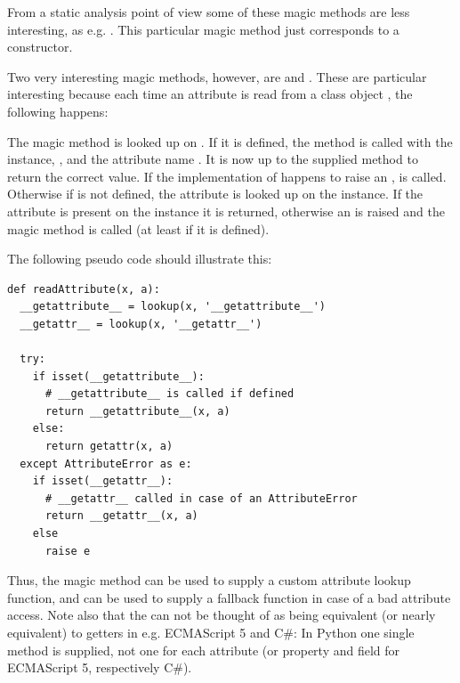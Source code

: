 From a static analysis point of view some of these magic methods are less interesting, as e.g. . This particular magic method just corresponds to a constructor.

Two very interesting magic methods, however, are  and . These are particular interesting because each time an attribute  is read from a class object , the following happens:

The magic method  is looked up on . If it is defined, the method is called with the instance, , and the attribute name . It is now up to the supplied method to return the correct value. If the implementation of  happens to raise an ,  is called. Otherwise if  is not defined, the attribute is looked up on the instance. If the attribute is present on the instance it is returned, otherwise an  is raised and the magic method  is called (at least if it is defined).

The following pseudo code should illustrate this:

\begin{listing}[H]
  \begin{verbatim}
def readAttribute(x, a):
  __getattribute__ = lookup(x, '__getattribute__')
  __getattr__ = lookup(x, '__getattr__')

  try:
    if isset(__getattribute__):
      # __getattribute__ is called if defined
      return __getattribute__(x, a)
    else:
      return getattr(x, a)
  except AttributeError as e:
    if isset(__getattr__):
      # __getattr__ called in case of an AttributeError
      return __getattr__(x, a)
    else
      raise e
  \end{verbatim}
\end{listing}

Thus, the magic method  can be used to supply a custom attribute lookup function, and  can be used to supply a fallback function in case of a bad attribute access. Note also that the  can not be thought of as being equivalent (or nearly equivalent) to getters in e.g. ECMAScript 5 and C\#: In Python one single method is supplied, not one for each attribute (or property and field for ECMAScript 5, respectively C\#).

